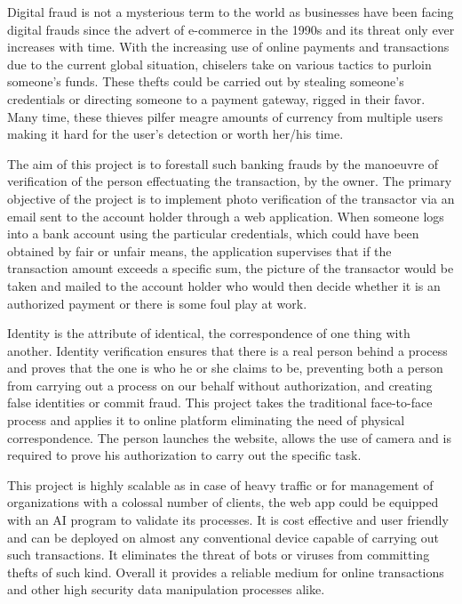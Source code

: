 \documentclass[12pt, oneside, a4paper]{article}
\begin{document}
Digital fraud is not a mysterious term to the world as businesses have been facing digital frauds since the advert of e-commerce in the 1990s and its threat only ever increases with time. With the increasing use of online payments and transactions due to the current global situation, chiselers take on various tactics to purloin someone's funds. These thefts could be carried out by stealing someone's credentials or directing someone to a payment gateway, rigged in their favor. Many time, these thieves pilfer meagre amounts of currency from multiple users making it hard for the user's detection or worth her/his time.

The aim of this project is to forestall such banking frauds by the manoeuvre of verification of the person effectuating the transaction, by the owner. The primary objective of the project is to implement photo verification of the transactor via an email sent to the account holder through a web application. When someone logs into a bank account using the particular credentials, which could have been obtained by fair or unfair means, the application supervises that if the transaction amount exceeds a specific sum, the picture of the transactor would be taken and mailed to the account holder who would then decide whether it is an authorized payment or there is some foul play at work.

Identity is the attribute of identical, the correspondence of one thing with another. Identity verification ensures that there is a real person behind a process and proves that the one is who he or she claims to be, preventing both a person from carrying out a process on our behalf without authorization, and creating false identities or commit fraud. This project takes the traditional face-to-face process and applies it to online platform eliminating the need of physical correspondence. The person launches the website, allows the use of camera and is required to prove his authorization to carry out the specific task.

This project is highly scalable as in case of heavy traffic or for management of organizations with a colossal number of clients, the web app could be equipped with an AI program to validate its processes. It is cost effective and user friendly and can be deployed on almost any conventional device capable of carrying out such transactions. It eliminates the threat of bots or viruses from committing thefts of such kind. Overall it provides a reliable medium for online transactions and other high security data manipulation processes alike.
\end{document}
